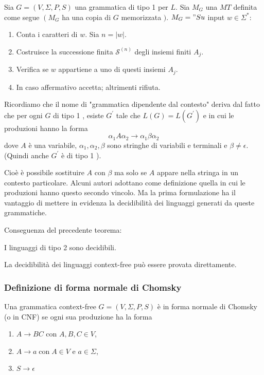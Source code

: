 \vspace{5mm}

Sia $G=(V, \Sigma, P, S)$ una grammatica di tipo 1 per $L .$ Sia $M_{G}$ una $M T$ definita come segue $\left(M_{G}\right.$ ha una copia di $G$ memorizzata $)$. $M_{G}=" S u$ input $w \in \Sigma^{*}:$
\begin{enumerate}
    \item Conta i caratteri di $w$. Sia $n=|w|$.
    \item Costruisce la successione finita $\mathcal{S}^{(n)}$ degli insiemi finiti $A_{j}$.
    \item Verifica se $w$ appartiene a uno di questi insiemi $A_{j}$.
    \item In caso affermativo accetta; altrimenti rifiuta.
\end{enumerate}

Ricordiamo che il nome di "grammatica dipendente dal contesto" deriva dal fatto che per ogni $G$ di tipo 1 , esiste $G^{\prime}$ tale che $L(G)=L\left(G^{\prime}\right)$ e in cui le produzioni hanno la forma
$$
\alpha_{1} A \alpha_{2} \rightarrow \alpha_{1} \beta \alpha_{2}
$$
dove $A$ è una variabile, $\alpha_{1}, \alpha_{2}, \beta$ sono stringhe di variabili e terminali e $\beta \neq \epsilon$. (Quindi anche $G^{\prime}$ è di tipo 1 ).

Cioè è possibile sostituire $A$ con $\beta$ ma solo se $A$ appare nella stringa in un contesto particolare.
Alcuni autori adottano come definizione quella in cui le produzioni hanno questo secondo vincolo. Ma la prima formulazione ha il vantaggio di mettere in evidenza la decidibilità dei linguaggi generati da queste grammatiche.

\vspace{5mm}

Conseguenza del precedente teorema:

\vspace{5mm}
\begin{center}
    I linguaggi di tipo 2 sono decidibili.
\end{center}
\vspace{5mm}


La decidibilità dei linguaggi context-free può essere provata direttamente.

\subsubsection{Definizione di forma normale di Chomsky}

Una grammatica context-free $G=(V, \Sigma, P, S)$ è in forma normale di Chomsky (o in CNF) se ogni sua produzione ha la forma
\begin{enumerate}
    \item $A \rightarrow B C$ con $A, B, C \in V$,
    \item $A \rightarrow a \operatorname{con} A \in V$ e $a \in \Sigma$,
    \item $S \rightarrow \epsilon$
\end{enumerate}

